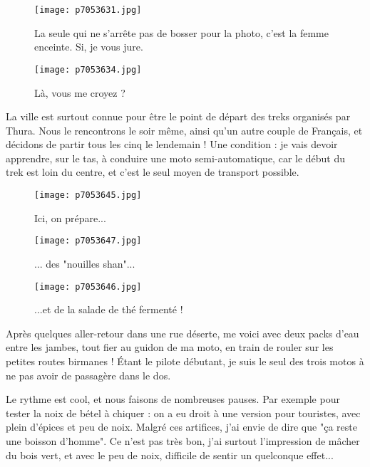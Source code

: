 \documentclass{book}
\begin{document}
\begin{figure}[h]
\centering
\texttt{[image: p7053631.jpg]}
\caption*{La seule qui ne s'arrête pas de bosser pour la photo, c'est la femme enceinte. Si, je vous jure.}
\end{figure}


\begin{figure}[h]
\centering
\texttt{[image: p7053634.jpg]}
\caption*{Là, vous me croyez ?}
\end{figure}

La ville est surtout connue pour être le point de départ des treks organisés par Thura. Nous le rencontrons le soir même, ainsi qu'un autre couple de Français, et décidons de partir tous les cinq le lendemain ! Une condition : je vais devoir apprendre, sur le tas, à conduire une moto semi-automatique, car le début du trek est loin du centre, et c'est le seul moyen de transport possible.


\begin{figure}[h]
\centering
\texttt{[image: p7053645.jpg]}
\caption*{Ici, on prépare...}
\end{figure}


\begin{figure}[h]
\centering
\texttt{[image: p7053647.jpg]}
\caption*{... des "nouilles shan"...}
\end{figure}


\begin{figure}[h]
\centering
\texttt{[image: p7053646.jpg]}
\caption*{...et de la salade de thé fermenté !}
\end{figure}

Après quelques aller-retour dans une rue déserte, me voici avec deux packs d'eau entre les jambes, tout fier au guidon de ma moto, en train de rouler sur les petites routes birmanes ! Étant le pilote débutant, je suis le seul des trois motos à ne pas avoir de passagère dans le dos.



Le rythme est cool, et nous faisons de nombreuses pauses. Par exemple pour tester la noix de bétel à chiquer : on a eu droit à une version pour touristes, avec plein d'épices et peu de noix. Malgré ces artifices, j'ai envie de dire que "ça reste une boisson d'homme". Ce n'est pas très bon, j'ai surtout l'impression de mâcher du bois vert, et avec le peu de noix, difficile de sentir un quelconque effet...
\end{document}
